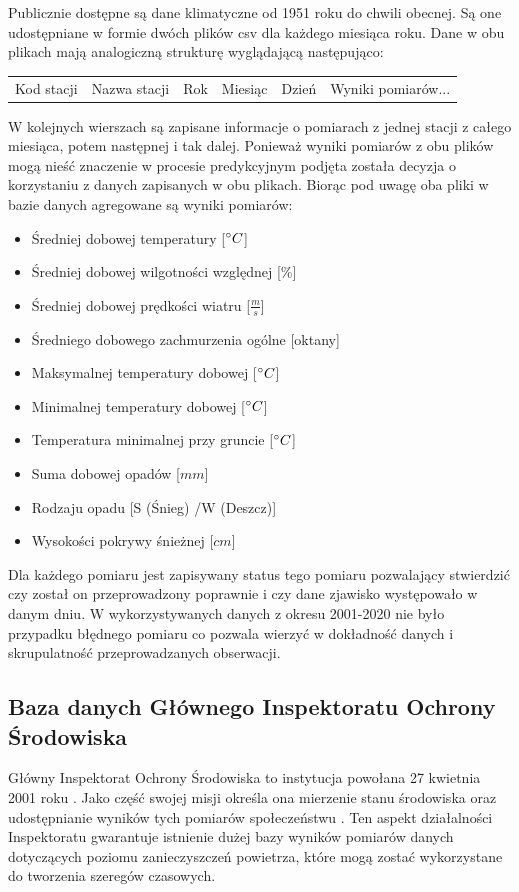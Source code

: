 \documentclass[10pt,a4paper]{article}
\begin{document}
Publicznie dostępne są dane klimatyczne od 1951 roku do chwili obecnej. Są one udostępniane w formie dwóch plików csv dla każdego miesiąca roku. Dane w obu plikach mają analogiczną strukturę wyglądającą następująco:
\begin{center}
	\begin{tabular}{|c|c|c|c|c|c}
		Kod stacji & Nazwa stacji & Rok & Miesiąc & Dzień & Wyniki pomiarów...
	\end{tabular}
\end{center}
W kolejnych wierszach są zapisane informacje o pomiarach z jednej stacji z całego miesiąca, potem następnej i tak dalej. Ponieważ wyniki pomiarów z obu plików mogą nieść znaczenie w procesie predykcyjnym podjęta została decyzja o korzystaniu z danych zapisanych w obu plikach. Biorąc pod uwagę oba pliki w bazie danych agregowane są wyniki pomiarów: 
\begin{itemize}
	\item Średniej dobowej temperatury [$\degree C$]
	\item Średniej dobowej wilgotności względnej [\%]
	\item Średniej dobowej prędkości wiatru [$\frac{m}{s}$]
	\item Średniego dobowego zachmurzenia ogólne [oktany]
	\item Maksymalnej temperatury dobowej [$\degree C$]
	\item Minimalnej temperatury dobowej [$\degree C$]
	\item Temperatura minimalnej przy gruncie [$\degree C$]
	\item Suma dobowej opadów [$mm$]
	\item Rodzaju opadu [S (Śnieg) /W (Deszcz)]
	\item Wysokości pokrywy śnieżnej [$cm$]
\end{itemize}
Dla każdego pomiaru jest zapisywany status tego pomiaru pozwalający stwierdzić czy został on przeprowadzony poprawnie i czy dane zjawisko występowało w danym dniu. W wykorzystywanych danych z okresu 2001-2020 nie było przypadku błędnego pomiaru co pozwala wierzyć w dokładność danych i skrupulatność przeprowadzanych obserwacji. 

\subsection{Baza danych Głównego Inspektoratu Ochrony Środowiska}
Główny Inspektorat Ochrony Środowiska to instytucja powołana 27 kwietnia 2001 roku \cite{giosStart}. Jako część swojej misji określa ona mierzenie stanu środowiska oraz udostępnianie wyników tych pomiarów społeczeństwu \cite{giosMission}. Ten aspekt działalności Inspektoratu gwarantuje istnienie dużej bazy wyników pomiarów danych dotyczących poziomu zanieczyszczeń powietrza, które mogą zostać wykorzystane do tworzenia szeregów czasowych. 
\end{document}
